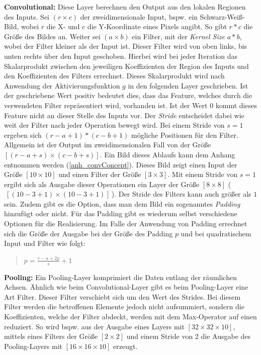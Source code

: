 \textbf{Convolutional:} Diese Layer berechnen den Output aus den lokalen Regionen des Inputs. Sei $(r \times c)$ der zweidimensionale Input, bspw. ein Schwarz-Weiß-Bild, wobei $r$ die X- und $c$ die Y-Koordinate eines Pixels angibt. So gibt $r*c$ die Größe des Bildes an. Weiter sei $(a \times b)$ ein Filter, mit der \emph{Kernel Size} $a*b$, wobei der Filter kleiner als der Input ist. Dieser Filter wird von oben links, bis unten rechts über den Input geschoben. Hierbei wird bei jeder Iteration das Skalarprodukt zwischen den jeweiligen Koeffizienten der Region des Inputs und den Koeffizienten des Filters errechnet. Dieses Skalarprodukt wird nach Anwendung der Aktivierungsfunktion $g$ in den folgenden Layer geschrieben. Ist der geschriebene Wert positiv bedeutet dies, dass das Feature, welches durch die verwendeten Filter repräsentiert wird, vorhanden ist. Ist der Wert $0$ kommt dieses Feature nicht an dieser Stelle des Inputs vor. Der \emph{Stride} entscheidet dabei wie weit der Filter nach jeder Operation bewegt wird. Bei einem Stride von $s=1$ ergeben sich $(r-a+1) * (c-b+1)$ mögliche Positionen für den Filter. Allgemein ist der Output im zweidimensionalen Fall von der Größe $[(r-a+s) \times (c-b+s)]$. Ein Bild dieses Ablaufs kann dem Anhang entnommen werden (\ref{anh_convConcept}). Dieses Bild zeigt einen Input der Größe $[10 \times 10]$ und einen Filter der Größe $[3 \times 3]$. Mit einem Stride von $s=1$ ergibt sich als Ausgabe dieser Operationen ein Layer der Größe $[8 \times 8]$ ($~[(10-3+1) \times (10-3+1)]~$). 
Der Stride des Filters kann auch größer als $1$ sein. Zudem gibt es die Option, dass man dem Bild ein sogenanntes \emph{Padding} hinzufügt oder nicht. Für das Padding gibt es wiederum selbst verschiedene Optionen für die Realisierung. Im Falle der Anwendung von Padding errechnet sich die Größe der Ausgabe bei der Größe des Padding $p$ und bei quadratischem Input und Filter wie folgt: 
\begin{quotation}
\centering
   \( p = \frac{r-a+2p}{s} + 1  \) 
\end{quotation}


\textbf{Pooling:} Ein Pooling-Layer komprimiert die Daten entlang der räumlichen Achsen. Ähnlich wie beim Convolutional-Layer gibt es beim Pooling-Layer eine Art Filter. Dieser Filter verschiebt sich um den Wert des Strides. Bei diesem Filter werden die betroffenen Elemente jedoch nicht aufsummiert, sondern die Koeffizienten, welche der Filter abdeckt, werden mit dem Max-Operator auf einen reduziert. So wird bspw. aus der Ausgabe eines Layers mit $[32 \times 32 \times 10]$, mittels eines Filters der Größe $[2 \times 2]$ und einem Stride von 2 die Ausgabe des Pooling-Layers mit $[16 \times 16 \times 10]$ erzeugt.

